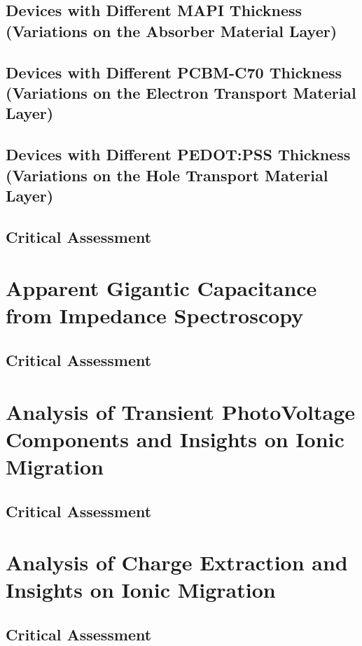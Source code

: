 \documentclass[a4paper, 12pt, openright]{book}
\begin{document}
	\section{Devices with Different MAPI Thickness (Variations on the Absorber Material Layer)}
	\section{Devices with Different PCBM-C70 Thickness (Variations on the Electron Transport Material Layer)}
	\section{Devices with Different PEDOT:PSS Thickness (Variations on the Hole Transport Material Layer)}
	\section{Critical Assessment}
	
\chapter{Apparent Gigantic Capacitance from Impedance Spectroscopy}

	\section{Critical Assessment}
	
\chapter{Analysis of Transient PhotoVoltage Components and Insights on Ionic Migration}

	\section{Critical Assessment}

\chapter{Analysis of Charge Extraction and Insights on Ionic Migration}

	\section{Critical Assessment}
	
\end{document}
